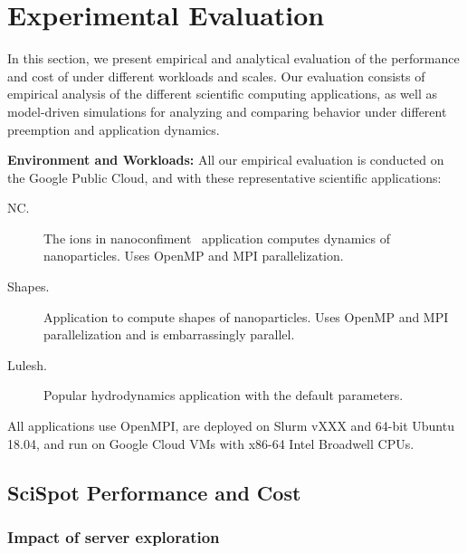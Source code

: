 \section{Experimental Evaluation}
\label{sec:eval}

In this section, we present empirical and analytical evaluation of the performance and cost of \sysname under different workloads and scales. 
Our evaluation consists of empirical analysis of the different scientific computing applications, as well as model-driven simulations for analyzing and comparing \sysname behavior under different preemption and application dynamics. 


\noindent \textbf{Environment and Workloads:} All our empirical evaluation is conducted on the Google Public Cloud, and with these representative scientific applications: 
\vspace*{\tightext}
\begin{description}
\item[NC.] The ions in nanoconfiment~\cite{} application computes dynamics of nanoparticles. Uses OpenMP and MPI parallelization. 
\item[Shapes.]  Application to compute shapes of nanoparticles. Uses OpenMP and MPI parallelization and is embarrassingly parallel. 
\item[Lulesh.] Popular hydrodynamics application with the default parameters. 
\end{description}
\vspace*{\tightext}
All applications use OpenMPI, are deployed on Slurm vXXX and 64-bit Ubuntu 18.04, and run on Google Cloud VMs with x86-64 Intel Broadwell CPUs. 


\subsection{SciSpot Performance and Cost}

\subsubsection{Impact of server exploration}

